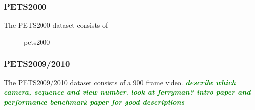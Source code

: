 \documentclass[smallcondensed, final]{svjour3}
\newcommand{\willie}[1]{\textcolor{green}{\textsf{\emph{\textbf{\textcolor{green}{#1}}}}}}
\begin{document}
\subsubsection{PETS2000}

The PETS2000 dataset consists of

\begin{figure}
	\centering
	\caption{pets2000}
	\label{fig:pets2000_results}
\end{figure}




\subsubsection{PETS2009/2010}

The PETS2009/2010 dataset consists of a 900 frame video. \willie{describe which camera, sequence and view number, look at ferryman? intro paper and performance benchmark paper for good descriptions}
\end{document}
